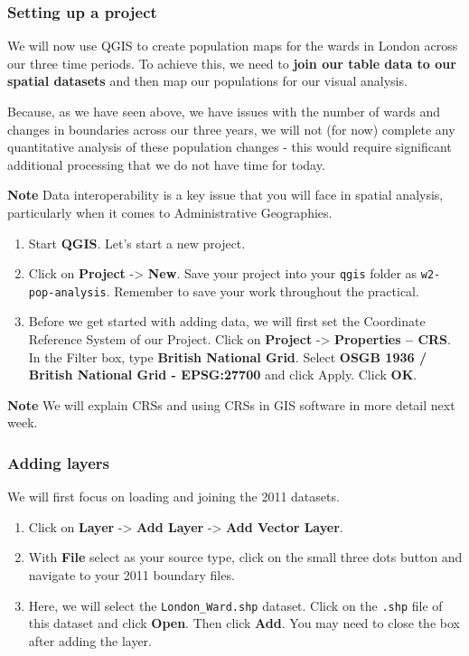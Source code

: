 \documentclass[
]{book}
\providecommand{\tightlist}{%
  \setlength{\itemsep}{0pt}\setlength{\parskip}{0pt}}
\begin{document}
\hypertarget{setting-up-a-project}{%
\subsubsection{Setting up a project}\label{setting-up-a-project}}

We will now use QGIS to create population maps for the wards in London across our three time periods. To achieve this, we need to \textbf{join our table data to our spatial datasets} and then map our populations for our visual analysis.

Because, as we have seen above, we have issues with the number of wards and changes in boundaries across our three years, we will not (for now) complete any quantitative analysis of these population changes - this would require significant additional processing that we do not have time for today.

\textbf{Note}
Data interoperability is a key issue that you will face in spatial analysis, particularly when it comes to Administrative Geographies.

\begin{enumerate}
\def\labelenumi{\arabic{enumi}.}
\tightlist
\item
  Start \textbf{QGIS}.
  Let's start a new project.
\item
  Click on \textbf{Project} -\textgreater{} \textbf{New}. Save your project into your \texttt{qgis} folder as \texttt{w2-pop-analysis}. Remember to save your work throughout the practical.
\item
  Before we get started with adding data, we will first set the Coordinate Reference System of our Project. Click on \textbf{Project} -\textgreater{} \textbf{Properties -- CRS}. In the Filter box, type \textbf{British National Grid}. Select \textbf{OSGB 1936 / British National Grid - EPSG:27700} and click Apply. Click \textbf{OK}.
\end{enumerate}

\textbf{Note}
We will explain CRSs and using CRSs in GIS software in more detail next week.

\hypertarget{adding-layers}{%
\subsubsection{Adding layers}\label{adding-layers}}

We will first focus on loading and joining the 2011 datasets.

\begin{enumerate}
\def\labelenumi{\arabic{enumi}.}
\setcounter{enumi}{4}
\item
  Click on \textbf{Layer} -\textgreater{} \textbf{Add Layer} -\textgreater{} \textbf{Add Vector Layer}.
\item
  With \textbf{File} select as your source type, click on the small three dots button and navigate to your 2011 boundary files.
\item
  Here, we will select the \texttt{London\_Ward.shp} dataset. Click on the \texttt{.shp} file of this dataset and click \textbf{Open}. Then click \textbf{Add}. You may need to close the box after adding the layer.
\end{enumerate}
\end{document}

